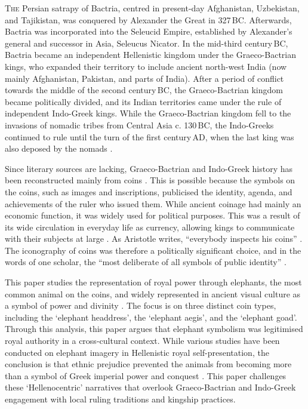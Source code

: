 \documentclass{ijsra}
\renewcommand\AD{{\,AD\xspace}}
\renewcommand\BC{{\,BC\xspace}}
\begin{document}
\IJSRAopening%

\lettrine{T}{he} Persian satrapy of Bactria, centred in present-day Afghanistan, Uzbekistan, and Tajikistan,
was conquered by Alexander the Great in 327\BC.
Afterwards, Bactria was incorporated into the Seleucid Empire, established by Alexander’s general and successor in Asia,
Seleucus Nicator.
In the mid-third century\BC, Bactria became an independent Hellenistic kingdom under the Graeco-Bactrian kings, 
who expanded their territory to include ancient north-west India (now mainly Afghanistan, Pakistan,
and parts of India).
After a period of conflict towards the middle of the second century\BC, the Graeco-Bactrian kingdom became politically divided,
and its Indian territories came under the rule of independent Indo-Greek kings.
While the Graeco-Bactrian kingdom fell to the invasions of nomadic tribes from Central Asia c. 130\BC,
the Indo-Greeks continued to rule until the turn of the first century\AD, when the last king was also deposed by the nomads
\parencites[47--50]{Bopearachchi2011}[3]{Mairs2014}. 

Since literary sources are lacking, Graeco-Bactrian and Indo-Greek history has been reconstructed mainly from coins \parencite[96--97]{Thonemann2015}.
This is possible because the symbols on the coins, such as images and inscriptions, publicised the identity, agenda, and achievements of the ruler who issued them.
While ancient coinage had mainly an economic function, it was widely used for political purposes. This was a result of its wide circulation in everyday life as currency, allowing kings to communicate with their subjects at large \parencite[11,61]{Howgego1995}.
As Aristotle writes, “everybody inspects his coins” .
The iconography of coins was therefore a politically significant choice, and in the words of one scholar, the “most deliberate of all symbols of public identity” \parencite[66]{Thonemann2015}.

This paper studies the representation of royal power through elephants, the most common animal on the coins, and widely represented in ancient visual culture as a symbol of power and divinity \parencites[383--384]{Bopearachchi1991}[11--19]{Gupta1983}[156]{Iossif2010}.
The focus is on three distinct coin types, including the ‘elephant headdress’, the ‘elephant aegis’, and the ‘elephant goad’. Through this analysis, this paper argues that elephant symbolism was legitimised royal authority in a cross-cultural context.  While various studies have been conducted on elephant imagery in Hellenistic royal self-presentation, the conclusion is that ethnic prejudice prevented the animals from becoming more than a symbol of Greek imperial power and conquest \parencites[263--264]{Alonso2013}[69]{Alonso2014}.
This paper challenges these ‘Hellenocentric’ narratives that overlook Graeco-Bactrian and Indo-Greek engagement with local ruling traditions and kingship practices.
\end{document}
